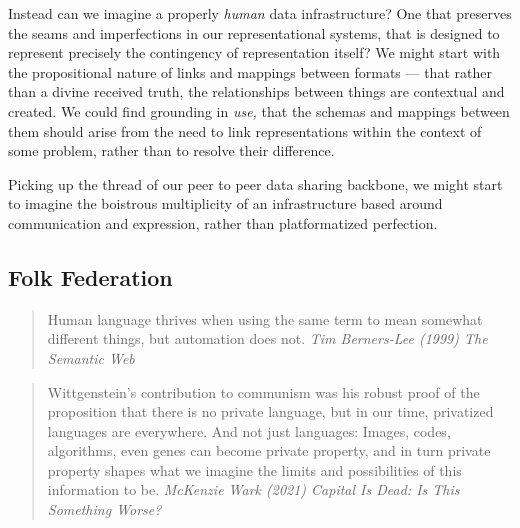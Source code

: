 Instead can we imagine a properly \emph{human} data infrastructure? One
that preserves the seams and imperfections in our representational
systems, that is designed to represent precisely the contingency of
representation itself? We might start with the propositional nature of
links and mappings between formats --- that rather than a divine
received truth, the relationships between things are contextual and
created. We could find grounding in \emph{use,} that the schemas and
mappings between them should arise from the need to link representations
within the context of some problem, rather than to resolve their
difference.

Picking up the thread of our peer to peer data sharing backbone, we
might start to imagine the boistrous multiplicity of an infrastructure
based around communication and expression, rather than platformatized
perfection.

\hypertarget{folk-federation}{%
\subsection{Folk Federation}\label{folk-federation}}

\begin{quote}
Human language thrives when using the same term to mean somewhat
different things, but automation does not. \emph{Tim Berners-Lee (1999)
The Semantic Web} \citep{berners-leeSemanticWeb2001} 
\end{quote}

\begin{quote}
Wittgenstein's contribution to communism was his robust proof of the
proposition that there is no private language, but in our time,
privatized languages are everywhere. And not just languages: Images,
codes, algorithms, even genes can become private property, and in turn
private property shapes what we imagine the limits and possibilities of
this information to be. \emph{McKenzie Wark (2021) Capital Is Dead: Is
This Something Worse?} \citep{warkCapitalDeadThis2021} 
\end{quote}

